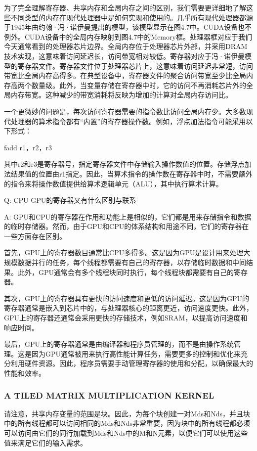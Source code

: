 \documentclass[11pt]{ctexart}
\begin{document}
为了完全理解寄存器、共享内存和全局内存之间的区别，我们需要更详细地了解这些不同类型的内存在现代处理器中是如何实现和使用的。几乎所有现代处理器都源于1945年由约翰·冯·诺伊曼提出的模型，该模型显示在图4.7中。CUDA设备也不例外。CUDA设备中的全局内存映射到图4.7中的Memory框。处理器框对应于我们今天通常看到的处理器芯片边界。全局内存位于处理器芯片外部，并采用DRAM技术实现，这意味着访问延迟长，访问带宽相对较低。寄存器对应于冯·诺伊曼模型的寄存器文件。寄存器文件位于处理器芯片上，这意味着访问延迟非常短，访问带宽比全局内存高得多。在典型设备中，寄存器文件的聚合访问带宽至少比全局内存高两个数量级。此外，当变量存储在寄存器中时，它的访问不再消耗芯片外的全局内存带宽。这种减少的带宽消耗将反映为增加的计算对全局内存访问比。

一个更微妙的问题是，每次访问寄存器需要的指令数比访问全局内存少。大多数现代处理器的算术指令都有“内置”的寄存器操作数。例如，浮点加法指令可能采用以下形式：

fadd r1，r2，r3

其中r2和r3是寄存器号，指定寄存器文件中存储输入操作数值的位置。存储浮点加法结果值的位置由r1指定。因此，当算术指令的操作数在寄存器中时，不需要额外的指令来将操作数值提供给算术逻辑单元（ALU），其中执行算术计算。

Q: CPU GPU的寄存器又有什么区别与联系

A: GPU和CPU的寄存器在作用和功能上是相似的，它们都是用来存储指令和数据的临时存储器。然而，由于GPU和CPU的体系结构和用途不同，它们的寄存器在一些方面存在区别。

首先，GPU上的寄存器数目通常比CPU多得多。这是因为GPU是设计用来处理大规模数据并行的任务，每个线程都需要有自己的寄存器，以存储临时数据和中间结果。此外，GPU通常会有多个线程块同时执行，每个线程块都需要有自己的寄存器。

其次，GPU上的寄存器具有更快的访问速度和更低的访问延迟。这是因为GPU的寄存器通常是嵌入到芯片中的，与处理器核心的距离更近，访问速度更快。此外，GPU上的寄存器还通常会采用更快的存储技术，例如SRAM，以提高访问速度和响应时间。

最后，GPU上的寄存器通常是由编译器和程序员管理的，而不是由操作系统管理。这是因为GPU通常被用来执行高性能计算任务，需要更多的控制和优化来充分利用硬件资源。因此，程序员需要手动管理寄存器的使用和分配，以确保最大的性能和效率。

\subsubsection{A TILED MATRIX MULTIPLICATION KERNEL}

请注意，共享内存变量的范围是块。因此，为每个块创建一对Mds和Nds，并且块中的所有线程都可以访问相同的Mds和Nds非常重要，因为块中的所有线程都必须可以访问由它们的同行加载到Mds和Nds中的M和N元素，以便它们可以使用这些值来满足它们的输入需求。
\end{document}
